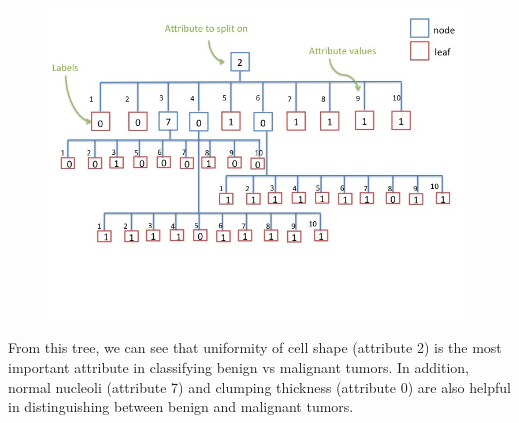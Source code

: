 \documentclass[12pt]{article}
\begin{document}
\begin{enumerate}
	\begin{figure}[H]
	\begin{center}
	\includegraphics[width=110mm]{4.jpg}
	\end{center}
	\end{figure}
From this tree, we can see that uniformity of cell shape (attribute 2) is the most important attribute in classifying benign vs malignant tumors. In addition, normal nucleoli (attribute 7) and clumping thickness (attribute 0) are also helpful in distinguishing between benign and malignant tumors.

\end{enumerate}
\end{document}
